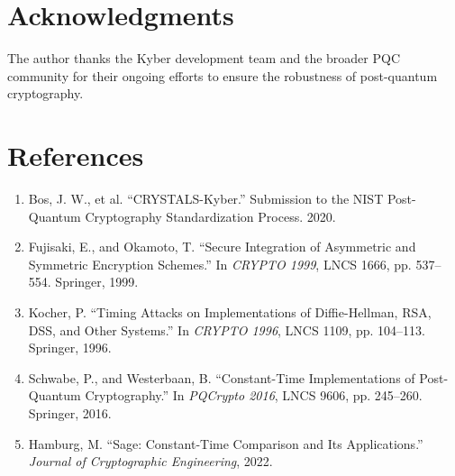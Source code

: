 \documentclass[11pt]{article}
\begin{document}
\section*{Acknowledgments}
The author thanks the Kyber development team and the broader PQC community for their ongoing efforts to ensure the robustness of post-quantum cryptography.

\section*{References}
\begin{enumerate}
    \item Bos, J. W., et al. ``CRYSTALS-Kyber.'' Submission to the NIST Post-Quantum Cryptography Standardization Process. 2020.
    \item Fujisaki, E., and Okamoto, T. ``Secure Integration of Asymmetric and Symmetric Encryption Schemes.'' In \textit{CRYPTO 1999}, LNCS 1666, pp. 537--554. Springer, 1999.
    \item Kocher, P. ``Timing Attacks on Implementations of Diffie-Hellman, RSA, DSS, and Other Systems.'' In \textit{CRYPTO 1996}, LNCS 1109, pp. 104--113. Springer, 1996.
    \item Schwabe, P., and Westerbaan, B. ``Constant-Time Implementations of Post-Quantum Cryptography.'' In \textit{PQCrypto 2016}, LNCS 9606, pp. 245--260. Springer, 2016.
    \item Hamburg, M. ``Sage: Constant-Time Comparison and Its Applications.'' \textit{Journal of Cryptographic Engineering}, 2022.
\end{enumerate}
\end{document}
